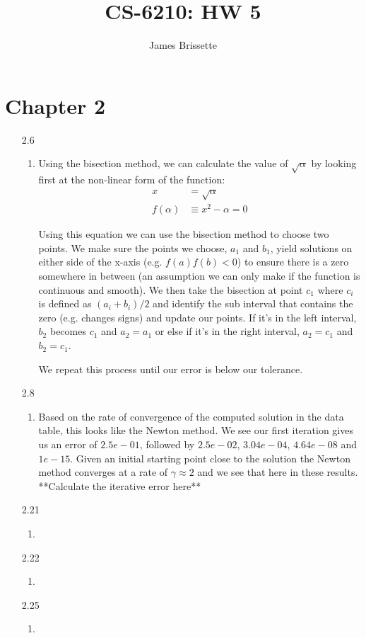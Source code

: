 \documentclass[11pt,a4paper]{article}
\author{James Brissette}
\title{CS-6210: HW 5}
\begin{document}
	\maketitle
	
	\section{Chapter 2}
		\begin{itemize}
			\item[2.6]
				\begin{enumerate} [label={\alph*)}]
					\item Using the bisection method, we can calculate the value of $\sqrt{\alpha}$ by looking first at the non-linear form of the function:
					\begin{align*}
						x &= \sqrt{\alpha} \\
						f(\alpha) &\equiv x^2 - \alpha = 0
					\end{align*}
					
					Using this equation we can use the bisection method to choose two points. We make sure the points we choose, $a_1$ and $b_1$, yield solutions on either side of the x-axis (e.g. $f(a)f(b) < 0$) to ensure there is a zero somewhere in between (an assumption we can only make if the function is continuous and smooth). We then take the bisection at point $c_1$ where $c_i$ is defined as $(a_i+b_i)/2$ and identify the sub interval that contains the zero (e.g. changes signs) and update our points. If it's in the left interval, $b_2$ becomes $c_1$ and $a_2 = a_1$ or else if it's in the right interval, $a_2 = c_1$ and $b_2 = c_1$.
					
					We repeat this process until our error is below our tolerance.
				\end{enumerate}
			\item[2.8]
				\begin{enumerate} [label={\alph*)}]
					\item Based on the rate of convergence of the computed solution in the data table, this looks like the Newton method. We see our first iteration gives us an error of $2.5e-01$, followed by $2.5e-02$, $3.04e-04$, $4.64e-08$ and $1e-15$. Given an initial starting point close to the solution the Newton method converges at a rate of $\gamma\approx2$ and we see that here in these results.
					**Calculate the iterative error here**
				\end{enumerate}
			\item[2.21]
				\begin{enumerate} [label={\alph*)}]
					\item 
				\end{enumerate}
			\item[2.22]
				\begin{enumerate} [label={\alph*)}]
					\item 
				\end{enumerate}
			\item[2.25]
				\begin{enumerate} [label={\alph*)}]
					\item 
				\end{enumerate}
					

\end{itemize}
\end{document}
